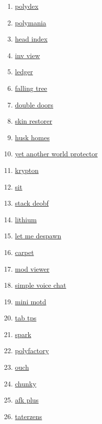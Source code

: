 \begin{enumerate}
    \item \href{https://github.com/Patbox/polydex}{polydex}
    \item \href{https://github.com/Patbox/polymania}{polymania}
    \item \href{https://github.com/PotatoPresident/HeadIndex}{head index}
    \item \href{https://github.com/PotatoPresident/InvView}{inv view}
    \item \href{https://github.com/QuiltServerTools/Ledger}{ledger}
    \item \href{https://github.com/RakambdaOrg/FallingTree}{falling tree}
    \item \href{https://github.com/Serilum/Double-Doors}{double doors}
    \item \href{https://github.com/Suiranoil/SkinRestorer}{skin restorer}
    \item \href{https://github.com/WiIIiam278/HuskHomes/}{husk homes}
    \item \href{https://github.com/Z0rdak/Yet-Another-World-Protector}{yet another world protector}
    \item \href{https://github.com/astei/krypton}{krypton}
    \item \href{https://github.com/bl4ckscor3/Sit}{sit}
    \item \href{https://github.com/booky10/StackDeobfuscator}{stack deobf}
    \item \href{https://github.com/caffeinemc/lithium-fabric}{lithium}
    \item \href{https://github.com/frikinjay/let-me-despawn}{let me despawn}
    \item \href{https://github.com/gnembon/fabric-carpet}{carpet}
    \item \href{https://github.com/haykam821/Mod-Viewer}{mod viewer}
    \item \href{https://github.com/henkelmax/simple-voice-chat}{simple voice chat}
    \item \href{https://github.com/jpenilla/MiniMOTD}{mini motd}
    \item \href{https://github.com/jpenilla/TabTPS}{tab tps}
    \item \href{https://github.com/lucko/spark}{spark}
    \item \href{https://github.com/patbox/PolyFactory}{polyfactory}
    \item \href{https://github.com/patbox/ouch}{ouch}
    \item \href{https://github.com/pop4959/Chunky}{chunky}
    \item \href{https://github.com/sakura-ryoko/afkplus}{afk plus}
    \item \href{https://github.com/samolego/Taterzens/}{taterzens}
\end{enumerate}


